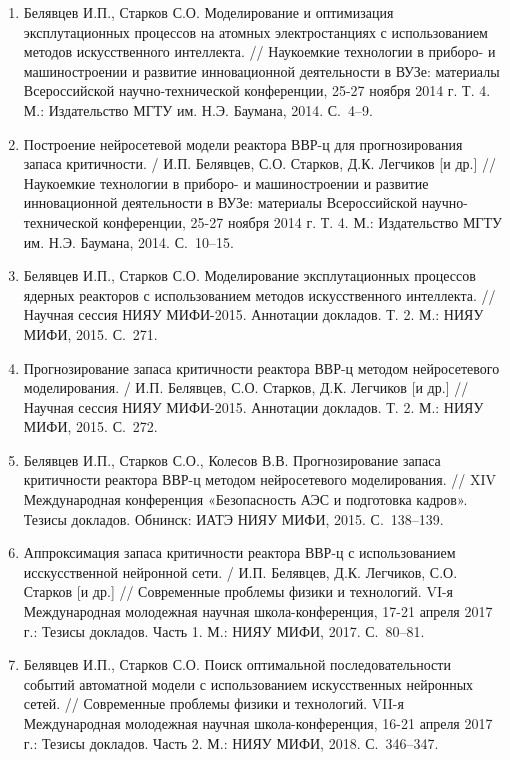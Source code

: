 \begin{enumerate}[resume]
    \item Белявцев И.П., Старков С.О. Моделирование и оптимизация эксплутационных процессов на атомных электростанциях с использованием методов искусственного интеллекта. // Наукоемкие технологии в приборо- и машиностроении и развитие инновационной деятельности в ВУЗе: материалы Всероссийской научно-технической конференции, 25-27 ноября 2014 г. Т. 4. М.: Издательство МГТУ им. Н.Э. Баумана, 2014. С.~4–9. \cite{modeling-2014}
    \item Построение нейросетевой модели реактора ВВР-ц для прогнозирования запаса критичности. / И.П. Белявцев, С.О. Старков, Д.К. Легчиков [и др.] // Наукоемкие технологии в приборо- и машиностроении и развитие инновационной деятельности в ВУЗе: материалы Всероссийской научно-технической конференции, 25-27 ноября 2014 г. Т. 4. М.: Издательство МГТУ им. Н.Э. Баумана, 2014. С.~10–15. \cite{criticality-2014}
    \item Белявцев И.П., Старков С.О. Моделирование эксплутационных процессов ядерных реакторов с использованием методов искусственного интеллекта. // Научная сессия НИЯУ МИФИ-2015. Аннотации докладов. Т. 2. М.: НИЯУ МИФИ, 2015. С.~271.\cite{modeling-2015}
    \item Прогнозирование запаса критичности реактора ВВР-ц методом нейросетевого моделирования. / И.П. Белявцев, С.О. Старков, Д.К. Легчиков [и др.] // Научная сессия НИЯУ МИФИ-2015. Аннотации докладов. Т. 2. М.: НИЯУ МИФИ, 2015. С.~272.\cite{criticality-2015}
    \item Белявцев И.П., Старков С.О., Колесов В.В. Прогнозирование запаса критичности реактора ВВР-ц методом нейросетевого моделирования. // XIV Международная конференция «Безопасность АЭС и подготовка кадров». Тезисы докладов. Обнинск: ИАТЭ НИЯУ МИФИ, 2015. С.~138–139. \cite{criticality-2015-2}
    \item Аппроксимация запаса критичности реактора ВВР-ц с использованием исскусственной нейронной сети. / И.П. Белявцев, Д.К. Легчиков, С.О. Старков [и др.] // Современные проблемы физики и технологий. VI-я Международная молодежная научная школа-конференция, 17-21 апреля 2017 г.: Тезисы докладов. Часть 1. М.: НИЯУ МИФИ, 2017. С.~80–81. \cite{mephi-2017}
    \item Белявцев И.П., Старков С.О. Поиск оптимальной последовательности событий автоматной модели с использованием искусственных нейронных сетей. // Современные проблемы физики и технологий. VII-я Международная молодежная научная школа-конференция, 16-21 апреля 2017 г.: Тезисы докладов. Часть 2.  М.: НИЯУ МИФИ, 2018. С.~346–347. \cite{mephi-2018}
\end{enumerate}